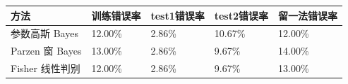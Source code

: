 \begin{tabular}{p{3.0cm}p{2.0cm}p{2.0cm}p{2.0cm}p{2.0cm}}
\toprule
方法 & 训练错误率 & test1错误率 & test2错误率 & 留一法错误率 \\
\midrule
参数高斯 Bayes & 12.00\% & 2.86\% & 10.67\% & 12.00\% \\
Parzen 窗 Bayes & 13.00\% & 2.86\% & 9.67\% & 14.00\% \\
Fisher 线性判别 & 12.00\% & 2.86\% & 9.67\% & 13.00\% \\
\bottomrule
\end{tabular}
